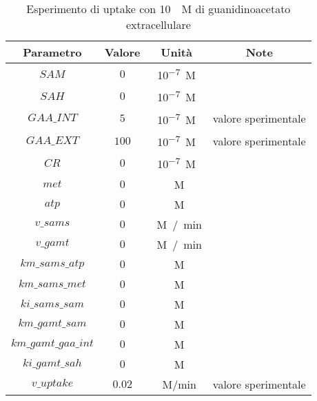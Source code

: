 \begin{table}[H]
	\centering
	\begin{tabular}{| c | c | c | c |}
	\hline
	Parametro & Valore & Unit\`a & Note \\
	\hline
	$SAM$ & $0$ & \si{10^{-7} M} & \\
	\hline
	$SAH$ & $0$ & \si{10^{-7} M} & \\
	\hline
	$GAA\_INT$ & $5$ & \si{10^{-7} M} & valore sperimentale \\
	\hline
	$GAA\_EXT$ & $100$ & \si{10^{-7} M} & valore sperimentale \\
	\hline
	$CR$ & $0$ & \si{10^{-7} M} & \\
	\hline
	$met$ & $0$ & \si{\mu M} & \\
	\hline
	$atp$ & $0$ & \si{\mu M} & \\
	\hline
	$v\_sams$ & $0$ & \si{\mu M / min} & \\
	\hline
	$v\_gamt$ & $0$ & \si{\mu M / min} & \\
	\hline
	$km\_sams\_atp$ & $0$ & \si{\mu M} & \\
	\hline
	$km\_sams\_met$ & $0$ & \si{\mu M} & \\
	\hline
	$ki\_sams\_sam$ & $0$ & \si{\mu M} & \\
	\hline
	$km\_gamt\_sam$ & $0$ & \si{\mu M} & \\
	\hline
	$km\_gamt\_gaa\_int$ & $0$ & \si{\mu M} & \\
	\hline
	$ki\_gamt\_sah$ & $0$ & \si{\mu M} & \\
	\hline
	$v\_uptake$ & $0.02$ & \si{\mu M/min} & valore sperimentale \\
	\hline
\end{tabular}
\caption{Esperimento di uptake con \SI{10}{\mu M} di guanidinoacetato extracellulare}
\label{mod:1}
\end{table}

